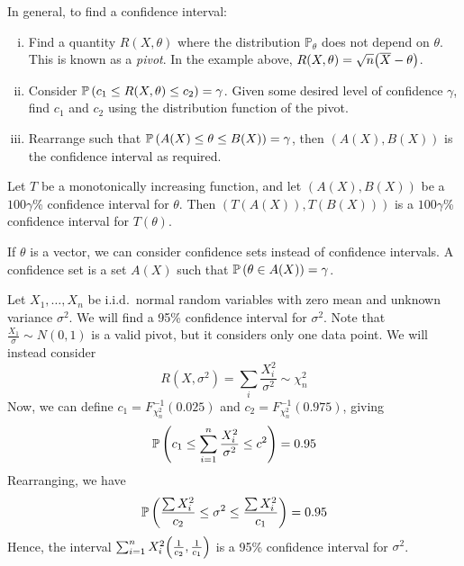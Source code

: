 \begin{remark}
	In general, to find a confidence interval:
	\begin{enumerate}[(i)]
		\item Find a quantity \( R(X,\theta) \) where the distribution \( \mathbb P_\theta \) does not depend on \( \theta \).
			This is known as a \textit{pivot}.
			In the example above, \( R(X,\theta) = \sqrt{n}\qty(\overline X - \theta) \).
		\item Consider \( \mathbb{P}\left({c_1 \leq R(X,\theta) \leq c_2}\right) = \gamma \).
			Given some desired level of confidence \( \gamma \), find \( c_1 \) and \( c_2 \) using the distribution function of the pivot.
		\item Rearrange such that \( \mathbb{P}\left({A(X) \leq \theta \leq B(X)}\right) = \gamma \), then \( (A(X), B(X)) \) is the confidence interval as required.
	\end{enumerate}
\end{remark}
\begin{proposition}
	Let \( T \) be a monotonically increasing function, and let \( (A(X), B(X)) \) be a \( 100 \gamma \)\% confidence interval for \( \theta \).
	Then \( (T(A(X)), T(B(X))) \) is a \( 100 \gamma \)\% confidence interval for \( T(\theta) \).
\end{proposition}
\begin{remark}
	If \( \theta \) is a vector, we can consider confidence sets instead of confidence intervals.
	A confidence set is a set \( A(X) \) such that \( \mathbb{P}\left({\theta \in A(X)}\right) = \gamma \).
\end{remark}
\begin{example}
	Let \( X_1, \dots, X_n \) be i.i.d.\ normal random variables with zero mean and unknown variance \( \sigma^2 \).
	We will find a 95\% confidence interval for \( \sigma^2 \).
	Note that \( \frac{X_1}{\sigma} \sim N(0,1) \) is a valid pivot, but it considers only one data point.
	We will instead consider
	\[ R(X, \sigma^2) = \sum_i \frac{X_i^2}{\sigma^2} \sim \chi^2_n \]
	Now, we can define \( c_1 = F_{\chi^2_n}^{-1}(0.025) \) and \( c_2 = F_{\chi^2_n}^{-1}(0.975) \), giving
	\[ \mathbb{P}\left({c_1 \leq \sum_{i=1}^n \frac{X_i^2}{\sigma^2} \leq c^2}\right) = 0.95 \]
	Rearranging, we have
	\[ \mathbb{P}\left({\frac{\sum X_i^2}{c_2} \leq \sigma^2 \leq \frac{\sum X_i^2}{c_1}}\right) = 0.95 \]
	Hence, the interval \( \sum_{i=1}^n X_i^2 \qty(\frac{1}{c_2}, \frac{1}{c_1}) \) is a 95\% confidence interval for \( \sigma^2 \).
\end{example}

